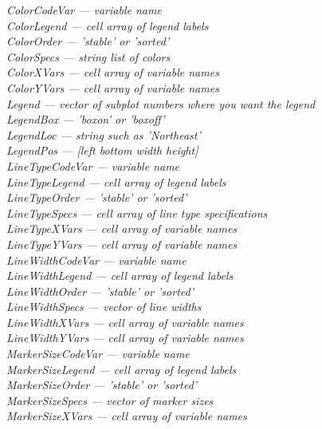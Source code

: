 \documentclass{article}
\newcommand{\namevalue}[2]{{\it #1 --- #2}}
\begin{document}
\namevalue{ColorCodeVar}{variable name} \\
\namevalue{ColorLegend}{cell array of legend labels} \\
\namevalue{ColorOrder}{'stable' or 'sorted'} \\
\namevalue{ColorSpecs}{string list of colors} \\
\namevalue{ColorXVars}{cell array of variable names} \\
\namevalue{ColorYVars}{cell array of variable names} \\
\namevalue{Legend}{vector of subplot numbers where you want the legend} \\
\namevalue{LegendBox}{'boxon' or 'boxoff'} \\
\namevalue{LegendLoc}{string such as 'Northeast'} \\
\namevalue{LegendPos}{[left bottom width height]} \\
\namevalue{LineTypeCodeVar}{variable name} \\
\namevalue{LineTypeLegend}{cell array of legend labels} \\
\namevalue{LineTypeOrder}{'stable' or 'sorted'} \\
\namevalue{LineTypeSpecs}{cell array of line type specifications} \\
\namevalue{LineTypeXVars}{cell array of variable names} \\
\namevalue{LineTypeYVars}{cell array of variable names} \\
\namevalue{LineWidthCodeVar}{variable name} \\
\namevalue{LineWidthLegend}{cell array of legend labels} \\
\namevalue{LineWidthOrder}{'stable' or 'sorted'} \\
\namevalue{LineWidthSpecs}{vector of line widths} \\
\namevalue{LineWidthXVars}{cell array of variable names} \\
\namevalue{LineWidthYVars}{cell array of variable names} \\
\namevalue{MarkerSizeCodeVar}{variable name} \\
\namevalue{MarkerSizeLegend}{cell array of legend labels} \\
\namevalue{MarkerSizeOrder}{'stable' or 'sorted'} \\
\namevalue{MarkerSizeSpecs}{vector of marker sizes} \\
\namevalue{MarkerSizeXVars}{cell array of variable names} \\
\end{document}
